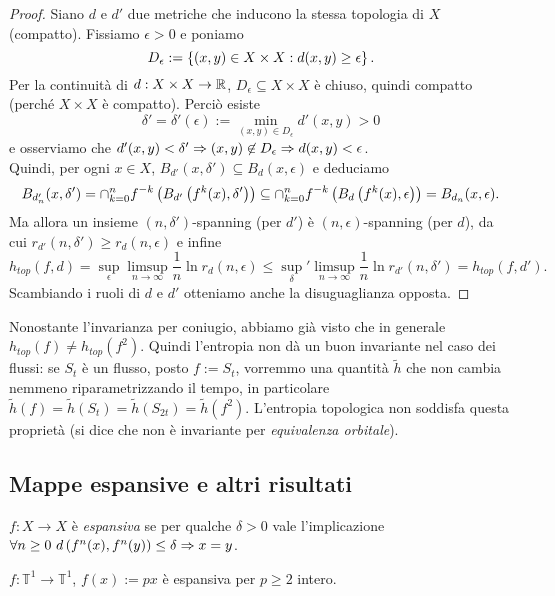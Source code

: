 \begin{proof}Siano $d$ e $d'$ due metriche che inducono la stessa topologia di $X$ (compatto).
Fissiamo $\epsilon>0$ e poniamo
\[ D_\epsilon:=\left\{(x,y)\in X\times X:d(x,y)\ge\epsilon\right\}. \]
Per la continuità di $d:X\times X\to\mathbb{R}$, $D_\epsilon\subseteq X\times X$ è chiuso, quindi compatto (perché $X\times X$ è compatto).
Perciò esiste
\[ \delta'=\delta'(\epsilon):=\min_{(x,y)\in D_\epsilon}d'(x,y)>0 \]
e osserviamo che $d'(x,y)<\delta'\Rightarrow (x,y)\not\in D_\epsilon\Rightarrow d(x,y)<\epsilon$. \\
Quindi, per ogni $x\in X$, $B_{d'}(x,\delta')\subseteq B_d(x,\epsilon)$ e deduciamo
\[ B_{d'_n}(x,\delta')=\cap_{k=0}^n f^{-k}\left(B_{d'}\left(f^k(x),\delta'\right)\right)\subseteq\cap_{k=0}^n f^{-k}\left(B_d\left(f^k(x),\epsilon\right)\right)
=B_{d_n}(x,\epsilon). \]
Ma allora un insieme $(n,\delta')$-spanning (per $d'$) è $(n,\epsilon)$-spanning (per $d$), da cui
$r_{d'}(n,\delta')\ge r_d(n,\epsilon)$ e infine
\[ h_{top}(f,d)=\sup_\epsilon \limsup_{n\to\infty}\frac{1}{n}\ln r_d(n,\epsilon)
\le \sup_\delta'\limsup_{n\to\infty}\frac{1}{n}\ln r_{d'}(n,\delta')=h_{top}(f,d'). \]
Scambiando i ruoli di $d$ e $d'$ otteniamo anche la disuguaglianza opposta.
\end{proof}

\begin{oss}Nonostante l'invarianza per coniugio, abbiamo già visto che in generale $h_{top}(f)\neq h_{top}(f^2)$.
Quindi l'entropia non dà un buon invariante nel caso dei flussi: se $S_t$ è un flusso, posto $f:=S_t$, vorremmo
una quantità $\tilde{h}$ che non cambia nemmeno riparametrizzando il tempo, in particolare
$\tilde{h}(f)=\tilde{h}(S_t)=\tilde{h}(S_{2t})=\tilde{h}(f^2)$.
L'entropia topologica non soddisfa questa proprietà (si dice che non è invariante per \emph{equivalenza orbitale}).
\end{oss}

\subsection{Mappe espansive e altri risultati}

\begin{defi}$f:X\to X$ è \emph{espansiva} se per qualche $\delta>0$ vale l'implicazione
$\forall n\ge 0\ d\pa{f^n(x),f^n(y)}\le\delta\implica x=y$.
\end{defi}

\begin{esempio}$f:\mathbb{T}^1\to\mathbb{T}^1$, $f(x):=px$ è espansiva per $p\ge 2$ intero.
\end{esempio}

